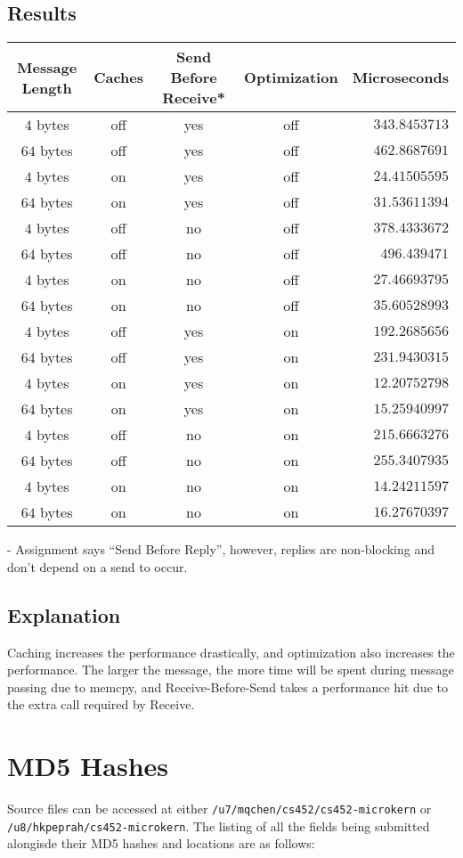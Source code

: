 \documentclass[12pt]{article}
\begin{document}
\subsection{Results}
\begin{tabular}{|c|c|c|c|r|}
  \hline
  {\bf Message Length} & {\bf Caches} & {\bf Send Before Receive*} & {\bf Optimization } & {\bf Microseconds} \\\hline
  $4$ bytes & off & yes & off & $343.8453713$ \\\hline
  $64$ bytes & off & yes & off & $462.8687691$ \\\hline
  $4$ bytes & on & yes & off & $24.41505595$ \\\hline
  $64$ bytes & on & yes & off & $31.53611394$ \\\hline
  $4$ bytes & off & no & off & $378.4333672$ \\\hline
  $64$ bytes & off & no & off & $496.439471$ \\\hline
  $4$ bytes & on & no & off & $27.46693795$ \\\hline
  $64$ bytes & on & no & off & $35.60528993$ \\\hline
  $4$ bytes & off & yes & on & $192.2685656$ \\\hline
  $64$ bytes & off & yes & on & $231.9430315$ \\\hline
  $4$ bytes & on & yes & on & $12.20752798$ \\\hline
  $64$ bytes & on & yes & on & $15.25940997$ \\\hline
  $4$ bytes & off & no & on & $215.6663276$ \\\hline
  $64$ bytes & off & no & on & $255.3407935$ \\\hline
  $4$ bytes & on & no & on & $14.24211597$ \\\hline
  $64$ bytes & on & no & on & $16.27670397$ \\\hline
\end{tabular}
{\tiny {\bf *} - Assignment says ``Send Before Reply'', however, replies are non-blocking and don't depend on a send to occur.}
\\[1\baselineskip]
\subsection{Explanation}
Caching increases the performance drastically, and optimization also increases the performance. The larger the message, the more time will be spent during message passing due to memcpy, and Receive-Before-Send takes a performance hit due to the extra call required by Receive.
\\[2\baselineskip]
\section{MD5 Hashes}
Source files can be accessed at either \texttt{/u7/mqchen/cs452/cs452-microkern} or \\ \texttt{/u8/hkpeprah/cs452-microkern}. The listing of all the fields being submitted alongisde their MD5 hashes and locations are as follows:\\

\end{document}
